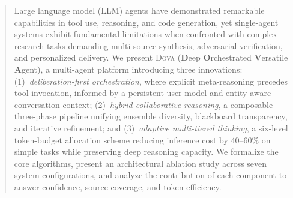\documentclass{article}
\theoremstyle{plain}
\theoremstyle{definition}
\newcommand{\dova}{\textsc{Dova}}
\begin{document}


\printAffiliationsAndNotice{}

\makeatletter
\gdef\@icmltitlerunning{DOVA: Deliberation-First Multi-Agent Orchestration}
\makeatother

\begin{abstract}
Large language model (LLM) agents have demonstrated remarkable capabilities in
tool use, reasoning, and code generation, yet single-agent systems exhibit
fundamental limitations when confronted with complex research tasks demanding
multi-source synthesis, adversarial verification, and personalized delivery.
We present \dova{} (\textbf{D}eep \textbf{O}rchestrated \textbf{V}ersatile
\textbf{A}gent), a multi-agent platform introducing three innovations:
(1)~\emph{deliberation-first orchestration}, where explicit meta-reasoning
precedes tool invocation, informed by a persistent user model and entity-aware
conversation context;
(2)~\emph{hybrid collaborative reasoning}, a composable three-phase pipeline
unifying ensemble diversity, blackboard transparency, and iterative refinement;
and (3)~\emph{adaptive multi-tiered thinking}, a six-level token-budget
allocation scheme reducing inference cost by 40--60\% on simple tasks while
preserving deep reasoning capacity.
We formalize the core algorithms, present an architectural ablation study
across seven system configurations, and analyze the contribution of each
component to answer confidence, source coverage, and token efficiency.
\end{abstract}
\end{document}
